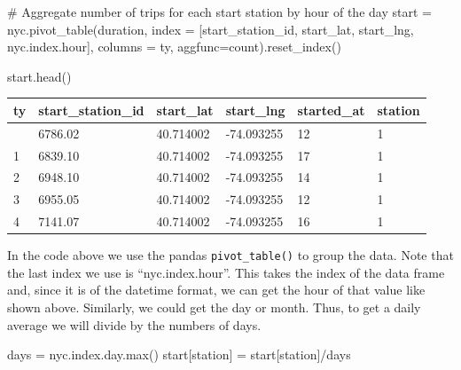 \documentclass[
  letterpaper,
  DIV=11,
  numbers=noendperiod]{scrreprt}
\newenvironment{Shaded}{\begin{snugshade}}{\end{snugshade}}
\newcommand{\BuiltInTok}[1]{\textcolor[rgb]{0.00,0.23,0.31}{#1}}
\newcommand{\CommentTok}[1]{\textcolor[rgb]{0.37,0.37,0.37}{#1}}
\newcommand{\NormalTok}[1]{\textcolor[rgb]{0.00,0.23,0.31}{#1}}
\newcommand{\OperatorTok}[1]{\textcolor[rgb]{0.37,0.37,0.37}{#1}}
\newcommand{\StringTok}[1]{\textcolor[rgb]{0.13,0.47,0.30}{#1}}
\begin{document}
\begin{Shaded}
\begin{Highlighting}[]
\CommentTok{\# Aggregate number of trips for each start station by hour of the day}
\NormalTok{start }\OperatorTok{=}\NormalTok{ nyc.pivot\_table(}\StringTok{\textquotesingle{}duration\textquotesingle{}}\NormalTok{, }
\NormalTok{                     index }\OperatorTok{=}\NormalTok{ [}\StringTok{\textquotesingle{}start\_station\_id\textquotesingle{}}\NormalTok{, }
                              \StringTok{\textquotesingle{}start\_lat\textquotesingle{}}\NormalTok{, }
                              \StringTok{\textquotesingle{}start\_lng\textquotesingle{}}\NormalTok{, }
\NormalTok{                              nyc.index.hour],}
\NormalTok{                     columns }\OperatorTok{=} \StringTok{\textquotesingle{}ty\textquotesingle{}}\NormalTok{,}
\NormalTok{                     aggfunc}\OperatorTok{=}\StringTok{\textquotesingle{}count\textquotesingle{}}\NormalTok{).reset\_index()}

\NormalTok{start.head()}
\end{Highlighting}
\end{Shaded}

\begin{longtable}[]{@{}llllll@{}}
\toprule\noalign{}
ty & start\_station\_id & start\_lat & start\_lng & started\_at &
station \\
\midrule\noalign{}
\endhead
\bottomrule\noalign{}
\endlastfoot
0 & 6786.02 & 40.714002 & -74.093255 & 12 & 1 \\
1 & 6839.10 & 40.714002 & -74.093255 & 17 & 1 \\
2 & 6948.10 & 40.714002 & -74.093255 & 14 & 1 \\
3 & 6955.05 & 40.714002 & -74.093255 & 12 & 1 \\
4 & 7141.07 & 40.714002 & -74.093255 & 16 & 1 \\
\end{longtable}

In the code above we use the pandas \texttt{pivot\_table()} to group the
data. Note that the last index we use is ``nyc.index.hour''. This takes
the index of the data frame and, since it is of the datetime format, we
can get the hour of that value like shown above. Similarly, we could get
the day or month. Thus, to get a daily average we will divide by the
numbers of days.

\begin{Shaded}
\begin{Highlighting}[]
\NormalTok{days }\OperatorTok{=}\NormalTok{ nyc.index.day.}\BuiltInTok{max}\NormalTok{()}
\NormalTok{start[}\StringTok{\textquotesingle{}station\textquotesingle{}}\NormalTok{] }\OperatorTok{=}\NormalTok{ start[}\StringTok{\textquotesingle{}station\textquotesingle{}}\NormalTok{]}\OperatorTok{/}\NormalTok{days}
\end{Highlighting}
\end{Shaded}
\end{document}
